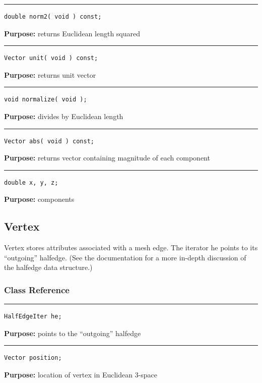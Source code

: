 \documentclass{article}
\begin{document}
\hspace{-.21in}\rule{5in}{1pt}
\begin{verbatim}
double norm2( void ) const;
\end{verbatim}
\textbf{Purpose:}
returns Euclidean length squared

\hspace{-.21in}\rule{5in}{1pt}
\begin{verbatim}
Vector unit( void ) const;
\end{verbatim}
\textbf{Purpose:}
returns unit vector

\hspace{-.21in}\rule{5in}{1pt}
\begin{verbatim}
void normalize( void );
\end{verbatim}
\textbf{Purpose:}
divides by Euclidean length

\hspace{-.21in}\rule{5in}{1pt}
\begin{verbatim}
Vector abs( void ) const;
\end{verbatim}
\textbf{Purpose:}
returns vector containing magnitude of each component

\hspace{-.21in}\rule{5in}{1pt}
\begin{verbatim}
double x, y, z;
\end{verbatim}
\textbf{Purpose:}
components
\pagebreak\subsection{Vertex}

 

 Vertex stores attributes associated with a mesh edge.  The iterator he points to its ``outgoing'' halfedge.  (See the documentation for a more in-depth discussion of the halfedge data structure.) 



\subsubsection{Class Reference}

\rule{5in}{1pt}
\begin{verbatim}
HalfEdgeIter he;
\end{verbatim}
\textbf{Purpose:}
points to the ``outgoing'' halfedge

\hspace{-.21in}\rule{5in}{1pt}
\begin{verbatim}
Vector position;
\end{verbatim}
\textbf{Purpose:}
location of vertex in Euclidean 3-space
\end{document}
